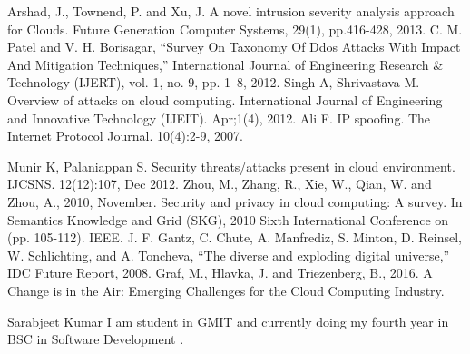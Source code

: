 \documentclass[10pt,journal,compsoc]{IEEEtran}
\begin{document}
\begin{thebibliography}{1}
\vspace{5mm}
\bibitem{}
Arshad, J., Townend, P. and Xu, J. A novel intrusion severity analysis approach for Clouds. Future Generation Computer Systems, 29(1), pp.416-428, 2013.
\vspace{5mm}
\bibitem{}
C. M. Patel and V. H. Borisagar, “Survey On Taxonomy Of Ddos Attacks With Impact And Mitigation Techniques,” International Journal of Engineering Research \& Technology (IJERT), vol. 1, no. 9, pp. 1–8, 2012.
\vspace{5mm}
\bibitem{}
Singh A, Shrivastava M. Overview of attacks on cloud computing. International Journal of Engineering and Innovative Technology (IJEIT). Apr;1(4), 2012. 
\vspace{5mm}
\bibitem{}
Ali F. IP spoofing. The Internet Protocol Journal. 10(4):2-9, 2007.
\vspace{5mm}

\bibitem{}
Munir K, Palaniappan S. Security threats/attacks present in cloud environment. IJCSNS. 12(12):107, Dec 2012.
\vspace{5mm}
\bibitem{}
Zhou, M., Zhang, R., Xie, W., Qian, W. and Zhou, A., 2010, November. Security and privacy in cloud computing: A survey. In Semantics Knowledge and Grid (SKG), 2010 Sixth International Conference on (pp. 105-112). IEEE.
\vspace{5mm}
\bibitem{}
J. F. Gantz, C. Chute, A. Manfrediz, S. Minton, D. Reinsel, W. Schlichting, and A. Toncheva, “The diverse and exploding digital universe,” IDC Future Report, 2008.
\vspace{5mm}
\bibitem{}
Graf, M., Hlavka, J. and Triezenberg, B., 2016. A Change is in the Air: Emerging Challenges for the Cloud Computing Industry.

\end{thebibliography}
\vspace{-8cm}

\begin{IEEEbiographynophoto}{Sarabjeet Kumar}
I am student in GMIT and currently doing my fourth year in BSC in Software Development .
\end{IEEEbiographynophoto}



\end{document}
